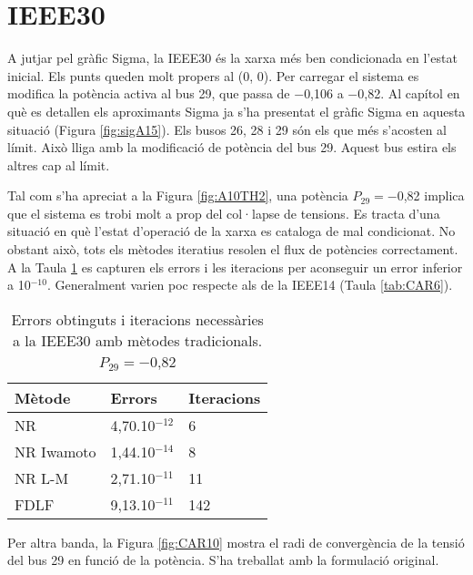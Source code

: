 \section{IEEE30}
A jutjar pel gràfic Sigma, la IEEE30 és la xarxa més ben condicionada en l'estat inicial. Els punts queden molt propers al (0, 0). Per carregar el sistema es modifica la potència activa al bus 29, que passa de $-$0,106 a $-$0,82. Al capítol en què es detallen els aproximants Sigma ja s'ha presentat el gràfic Sigma en aquesta situació (Figura \ref{fig:sigA15}). Els busos 26, 28 i 29 són els que més s'acosten al límit. Això lliga amb la modificació de potència del bus 29. Aquest bus estira els altres cap al límit. 

Tal com s'ha apreciat a la Figura \ref{fig:A10TH2}, una potència $P_{29}=-$0,82 implica que el sistema es trobi molt a prop del col·lapse de tensions. Es tracta d'una situació en què l'estat d'operació de la xarxa es cataloga de mal condicionat. No obstant això, tots els mètodes iteratius resolen el flux de potències correctament. A la Taula \ref{tab:CAR13x} es capturen els errors i les iteracions per aconseguir un error inferior a 10$^{-10}$. Generalment varien poc respecte als de la IEEE14 (Taula \ref{tab:CAR6}).

\begin{table}[!htb]
  \begin{center}
  \begin{tabular}{lll}
  \hline
  Mètode & Errors & Iteracions\\
  \hline
  \hline
  NR & 4,70.10$^{-12}$ & 6\\ 
  NR Iwamoto & 1,44.10$^{-14}$ & 8\\
  NR L-M & 2,71.10$^{-11}$ & 11\\ 
  FDLF & 9,13.10$^{-11}$ & 142\\
  \hline 
  \end{tabular}
  \caption{Errors obtinguts i iteracions necessàries a la IEEE30 amb mètodes tradicionals. $P_{29}=-$0,82}
  \label{tab:CAR13x}
  \end{center}
\end{table}

Per altra banda, la Figura \ref{fig:CAR10} mostra el radi de convergència de la tensió del bus 29 en funció de la potència. S'ha treballat amb la formulació original.

